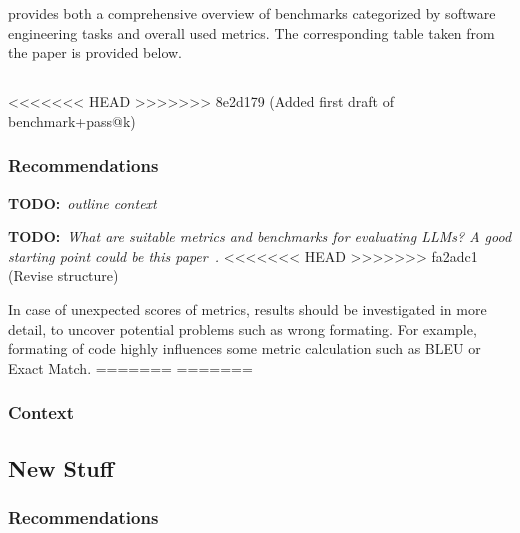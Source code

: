 \documentclass[11pt]{article}
\newcommand{\todo}[1]{{\textbf{TODO:}\ \textit{#1}}} %
\begin{document}
\cite{10.1145/3695988} provides both a comprehensive overview of benchmarks categorized by software engineering tasks and overall used metrics.
The corresponding table taken from the paper is provided below.

\subsection{}

<<<<<<< HEAD
>>>>>>> 8e2d179 (Added first draft of benchmark+pass@k)
\subsubsection{Recommendations}

\todo{outline context}

\todo{What are suitable metrics and benchmarks for evaluating LLMs? A good starting point could be this paper~\cite{10.1145/3695988}.}
<<<<<<< HEAD
>>>>>>> fa2adc1 (Revise structure)

In case of unexpected scores of metrics, results should be investigated in more detail, to uncover potential problems such as wrong formating.
For example, formating of code highly influences some metric calculation such as BLEU or Exact Match.
=======
=======
\subsubsection{Context}


\subsection{New Stuff}


\subsubsection{Recommendations}

\end{document}
